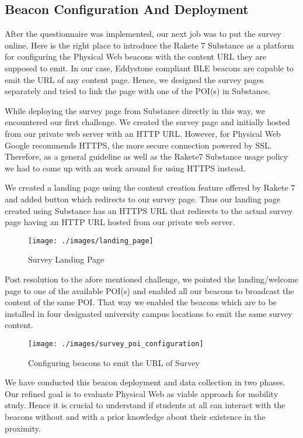 \subsection{Beacon Configuration And  Deployment}

After the questionnaire was implemented, our next job was to put the survey online. Here is the right place to introduce the Rakete 7 Substance as a platform for configuring the Physical Web beacons with the content URL they are supposed to emit. In our case, Eddystone\cite{EddyStone} compliant BLE beacons are capable to emit the URL of any content page. Hence, we designed the survey pages separately and tried to link the page with one of the POI(s) in Substance.
\par While deploying the survey page from Substance\cite{Rakete7Substance} directly in this way, we encountered our first challenge. We created the survey page and initially hosted from our private web server with an HTTP URL. However, for Physical Web Google  recommends HTTPS, the more secure connection powered by SSL. Therefore, as a general guideline as well as the Rakete7 Substance usage policy we had to come up with an work around for using HTTPS instead.
\par We created a landing page using the content creation feature offered by Rakete 7\cite{Rakete7} and added button which redirects to our survey page. Thus our landing page created using Substance has an HTTPS URL that redirects to the actual survey page having an HTTP URL hosted from our private web server.
\begin{figure}[H]
	\centering
	\texttt{[image: ./images/landing\_page]}
	\caption{Survey Landing Page}
	\label{figure1:survey_landing_page}
\end{figure}
\par Post resolution to the afore mentioned challenge, we pointed the landing/welcome page  to one of the available POI(s) and enabled all our beacons to broadcast the content of the same POI. That way we enabled the beacons which are to be installed in four designated university campus locations to emit the same survey content. 

\begin{figure}[H]
	\centering
	\texttt{[image: ./images/survey\_poi\_configuration]}
	\caption{Configuring beacons to emit the URL of Survey}
	\label{figure1:configuring_beacons_with_survey}
\end{figure}

We have conducted this beacon deployment and data collection in two phases. Our refined goal is to evaluate Physical Web as viable approach for mobility study. Hence it is crucial to understand if students at all can interact with the beacons without and with a prior knowledge about their existence in the proximity.

